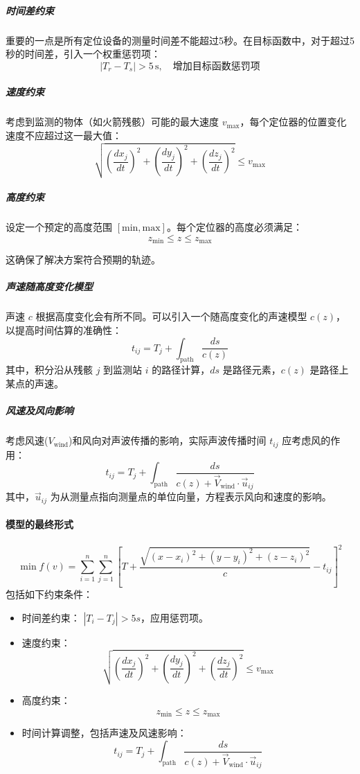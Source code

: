 \documentclass[withoutpreface,bwprint,12pt,a4paper]{cumcmthesis}
\begin{document}
\subparagraph{时间差约束}

重要的一点是所有定位设备的测量时间差不能超过5秒。在目标函数中，对于超过5秒的时间差，引入一个权重惩罚项：
\[
|T_r - T_s| > 5 \, \text{s}, \quad \text{增加目标函数惩罚项}
\]

\subparagraph{速度约束}

考虑到监测的物体（如火箭残骸）可能的最大速度 \(v_{\text{max}}\)，每个定位器的位置变化速度不应超过这一最大值：
\[
\sqrt{\left(\frac{dx_j}{dt}\right)^2 + \left(\frac{dy_j}{dt}\right)^2 + \left(\frac{dz_j}{dt}\right)^2} \leq v_{\text{max}}
\]

\subparagraph{高度约束}

设定一个预定的高度范围 \([{\text{min}}, {\text{max}}]\)。每个定位器的高度必须满足：
\[
z_{\text{min}} \leq z \leq z_{\text{max}}
\]

这确保了解决方案符合预期的轨迹。

\subparagraph{声速随高度变化模型}

声速 \(c\) 根据高度变化会有所不同。可以引入一个随高度变化的声速模型 \(c(z)\)，以提高时间估算的准确性：
\[
t_{ij} = T_j + \int_{\text{path}} \frac{ds}{c(z)}
\]
其中，积分沿从残骸 \(j\) 到监测站 \(i\) 的路径计算，\(ds\) 是路径元素，\(c(z)\) 是路径上某点的声速。

\subparagraph{风速及风向影响}

考虑风速(\(V_{\text{wind}}\))和风向对声波传播的影响，实际声波传播时间 \(t_{ij}\) 应考虑风的作用：
\[
t_{ij} = T_j + \int_{\text{path}} \frac{ds}{c(z) + \vec{V}_{\text{wind}} \cdot \vec{u}_{ij}}
\]
其中，\(\vec{u}_{ij}\) 为从测量点指向测量点的单位向量，方程表示风向和速度的影响。

\paragraph{模型的最终形式}

\[
\min f(v) = \sum_{i=1}^n \sum_{j=1}^n \left[ T + \frac{\sqrt{(x-x_i)^2 + (y-y_i)^2 + (z-z_i)^2}}{c} - t_{ij} \right]^2
\]
包括如下约束条件：
\begin{itemize}
    \item 时间差约束： \(|T_i - T_j| > 5s\)，应用惩罚项。
    \item 速度约束：
    \[
    \sqrt{\left(\frac{dx_j}{dt}\right)^2 + \left(\frac{dy_j}{dt}\right)^2 + \left(\frac{dz_j}{dt}\right)^2} \leq v_{\text{max}}
    \]
    \item 高度约束：
    \[
    z_{\text{min}} \leq z \leq z_{\text{max}}
    \]
    \item 时间计算调整，包括声速及风速影响：
    \[
    t_{ij} = T_j + \int_{\text{path}} \frac{ds}{c(z) + \vec{V}_{\text{wind}} \cdot \vec{u}_{ij}}
    \]
\end{itemize}
\end{document}

